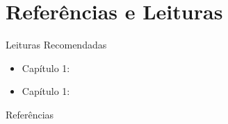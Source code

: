 \documentclass[aspectratio=169,xcolor=dvipsnames]{beamer}
\begin{document}
\section*{Referências e Leituras}
\begin{frame}{Leituras Recomendadas}
    \leiturasize
    \begin{itemize}
        \item Capítulo 1: 
        \item Capítulo 1: 
    \end{itemize}

\end{frame}




\begin{frame}{Referências}
    \printbibliography

\end{frame}



\end{document}
